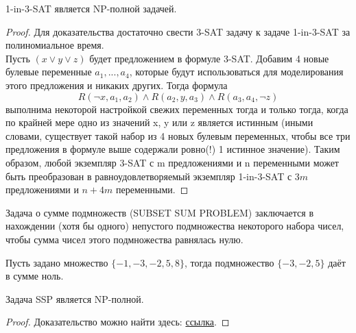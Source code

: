     \begin{Thm}
        1-in-3-SAT является NP-полной задачей.
    \end{Thm}
    \begin{proof}
        Для доказательства достаточно свести 3-SAT задачу к задаче 1-in-3-SAT за полиномиальное время.\\
        Пусть $(x \vee y \vee z)$ будет предложением в формуле 3-SAT. Добавим 4 новые булевые переменные $a_1, ..., a_4$, которые будут использоваться для моделирования этого предложения и никаких других. Тогда формула $$R(\neg x,a_1, a_2) \wedge R(a_2, y, a_3) \wedge R(a_3, a_4, \neg z)$$ выполнима некоторой настройкой свежих переменных тогда и только тогда, когда по крайней мере одно из значений x, y или z является истинным (иными словами, существует такой набор из 4 новых булевым переменных, чтобы все три предложения в формуле выше содержали ровно(!) 1 истинное значение). Таким образом, любой экземпляр 3-SAT с m предложениями и n переменными может быть преобразован в равноудовлетворяемый экземпляр 1-in-3-SAT с $3m$ предложениями и $n + 4m$ переменными.
    \end{proof}
    \begin{Def}
        Задача о сумме подмножеств (SUBSET SUM PROBLEM) заключается в нахождении (хотя бы одного) непустого подмножества некоторого набора чисел, чтобы сумма чисел этого подмножества равнялась нулю.
    \end{Def}
    \begin{Example}
        Пусть задано множество $\{-1, -3, -2, 5, 8\}$, тогда подмножество $\{-3, -2, 5\}$ даёт в сумме ноль.
    \end{Example}
    \begin{Thm}
        Задача SSP является NP-полной.
    \end{Thm}
    \begin{proof}
        Доказательство можно найти здесь:
        \href{https://neerc.ifmo.ru/wiki/index.php?title=NP-%D0%BF%D0%BE%D0%BB%D0%BD%D0%BE%D1%82%D0%B0_%D0%B7%D0%B0%D0%B4%D0%B0%D1%87%D0%B8_%D0%BE_%D1%81%D1%83%D0%BC%D0%BC%D0%B5_%D0%BF%D0%BE%D0%B4%D0%BC%D0%BD%D0%BE%D0%B6%D0%B5%D1%81%D1%82%D0%B2%D0%B0}{ссылка}.
    \end{proof}

    
    

